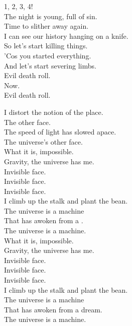 1, 2, 3, 4! \\

The night is young, full of sin. \\
Time to slither away again. \\
I can see our history hanging on a knife. \\

So let's start killing things. \\
'Cos you started everything. \\
And let's start severing limbs. \\

Evil death roll. \\
Now. \\
Evil death roll. \\




I distort the notion of the place. \\
The  other face. \\
The speed of light has slowed apace. \\
The universe's other face. \\

What it is, impossible. \\
Gravity, the universe has me. \\
Invisible face. \\
Invisible face. \\
Invisible face. \\

I climb up the stalk and plant the bean. \\
The universe is a machine \\
That has awoken from a . \\
The universe is a machine. \\

What it is, impossible. \\
Gravity, the universe has me. \\
Invisible face. \\
Invisible face. \\
Invisible face. \\

I climb up the stalk and plant the bean. \\
The universe is a machine \\
That has awoken from a dream. \\
The universe is a machine. \\

